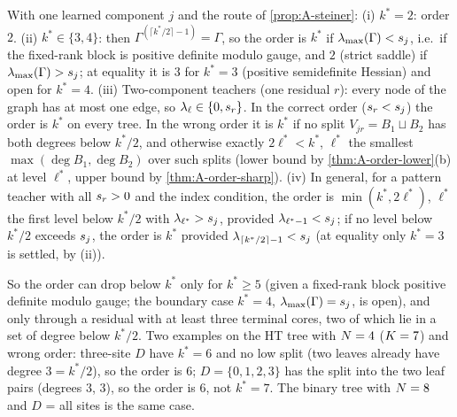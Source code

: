\begin{corollary}\label{cor:A-order}
  \proven{} \newresult{} With one learned component $j$ and the route of \cref{prop:A-steiner}:
  (i) $k^*=2$: order $2$. (ii) $k^*\in\{3,4\}$: then $\Gamma^{(\lceil k^*/2\rceil-1)}=\Gamma$, so the order is
  $k^*$ if $\lambda_{\max}(\Gamma)<s_{j}$, i.e.\ if the fixed-rank block is positive definite modulo gauge, and
  $2$ (strict saddle) if $\lambda_{\max}(\Gamma)>s_{j}$; at equality it is $3$ for $k^*=3$ (positive
  semidefinite Hessian) and open for $k^*=4$. (iii) Two-component teachers (one residual $r$): every node of
  the graph has at most one edge, so $\lambda_\ell\in\{0,s_{r}\}$. In the correct order ($s_{r}<s_{j}$) the
  order is $k^*$ on every tree. In the wrong order it is $k^*$ if no split $V_{jr}=B_1\sqcup B_2$ has
  both degrees below $k^*/2$, and otherwise exactly $2\ell^*<k^*$, $\ell^*$ the smallest
  $\max(\deg B_1,\deg B_2)$ over such splits (lower bound by \cref{thm:A-order-lower}(b) at level
  $\ell^*$, upper bound by \cref{thm:A-order-sharp}). (iv) In general, for a pattern teacher with all $s_{r}>0$ and
  the index condition, the order is $\min(k^*,2\ell^*)$, $\ell^*$ the first level below $k^*/2$ with
  $\lambda_{\ell^*}>s_{j}$, provided $\lambda_{\ell^*-1}<s_{j}$; if no level below $k^*/2$ exceeds $s_{j}$, the order
  is $k^*$ provided $\lambda_{\lceil k^*/2\rceil-1}<s_{j}$ (at equality only $k^*=3$ is settled, by (ii)).
\end{corollary}
So the order can drop below $k^*$ only for $k^*\ge5$ (given a fixed-rank block positive definite modulo gauge; the
boundary case $k^*=4$, $\lambda_{\max}(\Gamma)=s_{j}$, is open), and only through a residual with at least
three terminal cores, two of which lie in a set of degree below $k^*/2$. Two examples on the HT tree with $N=4$ ($K=7$) and wrong order: three-site $D$ have $k^*=6$ and
no low split (two leaves already have degree $3=k^*/2$), so the order is $6$; $D=\{0,1,2,3\}$ has the split
into the two leaf pairs (degrees $3$, $3$), so the order is $6$, not $k^*=7$. The binary tree with $N=8$
and $D$ = all sites is the same case.


